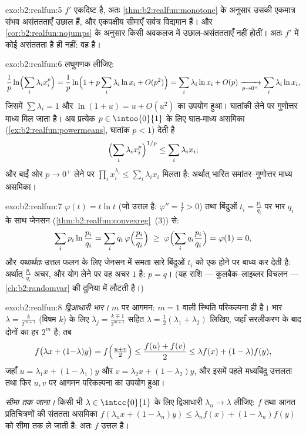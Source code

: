 \begin{solution}{exo:b2:realfun:5}
$f'$ एकदिष्ट है, अतः \cref{thm:b2:realfun:monotone} के अनुसार उसकी एकमात्र संभव असंततताएँ उछाल हैं,
और एकपक्षीय सीमाएँ सर्वत्र विद्यमान हैं। और \cref{cor:b2:realfun:nojumps} के अनुसार किसी अवकलज में
उछाल-असंततताएँ नहीं होतीं। अतः $f'$ में कोई असंततता है ही नहीं: वह 
है।
\end{solution}

\begin{solution}{exo:b2:realfun:6}
लघुगणक लीजिए:
\[
\frac1p \ln\Bigl(\sum_i \lambda_i x_i^p\Bigr)
= \frac1p \ln\Bigl(1 + p\sum_i \lambda_i \ln x_i +
O(p^2)\Bigr)
= \sum_i \lambda_i \ln x_i + O(p)
\xrightarrow[p \to 0^+]{} \sum_i \lambda_i \ln x_i ,
\]
जिसमें $\sum\lambda_i = 1$ और $\ln(1 + u) = u + O(u^2)$ का उपयोग हुआ। घातांकी लेने पर गुणोत्तर माध्य मिल जाता
है। अब प्रत्येक $p \in
\intoo{0}{1}$ के लिए घात-माध्य असमिका (\cref{ex:b2:realfun:powermeans}, घातांक $p < 1$) देती है
\[
\Bigl(\sum_i \lambda_i x_i^p\Bigr)^{1/p} \leq \sum_i\lambda_i x_i ;
\]
और बाईं ओर $p \to 0^+$ लेने पर $\prod_i x_i^{\lambda_i}
\leq \sum_i \lambda_i x_i$ मिलता है: अर्थात् भारित समांतर--गुणोत्तर माध्य
असमिका।
\end{solution}

\begin{solution}{exo:b2:realfun:7}
$\varphi(t) = t\ln t$ (जो उत्तल है: $\varphi'' = \frac1t > 0$) तथा बिंदुओं $t_i = \frac{p_i}{q_i}$ पर भार $q_i$ के साथ जेनसन (\cref{thm:b2:realfun:convexreg}~(3))
से:
\[
\sum_i p_i \ln\frac{p_i}{q_i}
= \sum_i q_i\, \varphi\Bigl(\frac{p_i}{q_i}\Bigr)
\;\geq\; \varphi\Bigl(\sum_i q_i \frac{p_i}{q_i}\Bigr)
= \varphi(1) = 0 ,
\]
और \emph{यथार्थतः} उत्तल फलन के लिए जेनसन में समता सारे बिंदुओं $t_i$ को
एक होने पर बाध्य कर देती है: अर्थात् $\frac{p_i}{q_i}$ अचर, और योग लेने पर वह अचर $1$
है: $p = q$। (यह राशि --- कुलबैक--लाइब्लर विचलन --- \cref{ch:b2:randomvar} की दुनिया में लौटती
है।)
\end{solution}

\begin{solution}{exo:b2:realfun:8}
\emph{द्विआधारी भार।} $m$ पर आगमन: $m = 1$ वाली स्थिति परिकल्पना ही है। भार
$\lambda = \frac{k}{2^{m+1}}$ (विषम $k$) के लिए $\lambda_j =
\frac{k \mp 1}{2^{m+1}}$ सहित $\lambda = \frac12(\lambda_1 + \lambda_2)$ लिखिए, जहाँ सरलीकरण के बाद दोनों का
हर $2^m$ है; तब
\[
f\bigl(\lambda x + (1{-}\lambda)y\bigr)
= f\Bigl(\tfrac{u + v}{2}\Bigr)
\leq \frac{f(u) + f(v)}{2}
\leq \lambda f(x) + (1 - \lambda) f(y),
\]
जहाँ $u = \lambda_1 x + (1 - \lambda_1)y$ और $v = \lambda_2 x +
(1-\lambda_2)y$, और इसमें पहले मध्यबिंदु उत्तलता तथा फिर $u, v$ पर आगमन
परिकल्पना का उपयोग हुआ।

\emph{सीमा तक जाना।} किसी भी $\lambda \in
\intcc{0}{1}$ के लिए द्विआधारी $\lambda_n \to \lambda$ लीजिए: $f$ तथा आनत
प्रतिचित्रणों की संततता असमिका $f(\lambda_n x + (1-\lambda_n)y) \leq \lambda_n f(x) +
(1-\lambda_n)f(y)$ को सीमा तक ले जाती है: अतः $f$ उत्तल
है।
\end{solution}

